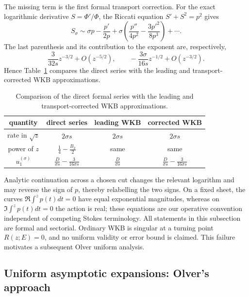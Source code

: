 \documentclass[11pt]{article}
\theoremstyle{remark}
\begin{document}
The missing term is the first formal transport correction.  For the exact
logarithmic derivative \(S=\Phi'/\Phi\), the Riccati equation
\(S'+S^2=p^2\) gives
\begin{equation}
 S_\sigma\sim \sigma p-\frac{p'}{2p}
 +\sigma\left(\frac{p''}{4p^2}-\frac{3p'^2}{8p^3}\right)+\cdots.
 \label{eq:lg-riccati-transport}
\end{equation}
The last parenthesis and its contribution to the exponent are, respectively,
\begin{equation}
 \frac{3}{32s}z^{-3/2}+O(z^{-5/2}),
 \qquad -\frac{3\sigma}{16s}z^{-1/2}+O(z^{-3/2}).
\end{equation}
Hence
Table~\ref{tab:wkb-transport-comparison} compares the direct series with the
leading and transport-corrected WKB approximations.
\begin{table}[htbp]
\centering
\caption{Comparison of the direct formal series with the leading and
transport-corrected WKB approximations.}
\label{tab:wkb-transport-comparison}
\begin{tabular}{c|c|c|c}
 quantity & direct series & leading WKB & corrected WKB\\ \hline
 rate in \(\sqrt z\) & \(2\sigma s\) & \(2\sigma s\) & \(2\sigma s\)\\
 power of \(z\) & \(\frac14-\frac{B_2}{2}\) & same & same\\
 \(u_1^{(\sigma)}\) & \(\frac{D}{\sigma s}-\frac{3}{16\sigma s}\)
 & \(\frac{D}{\sigma s}\)
 & \(\frac{D}{\sigma s}-\frac{3}{16\sigma s}\)
\end{tabular}
\end{table}

Analytic continuation across a chosen cut changes the relevant logarithm and
may reverse the sign of \(p\), thereby relabelling the two signs.  On a fixed
sheet, the curves \(\Re\int^z p(t)dt=0\) have equal exponential magnitudes,
whereas on \(\Im\int^z p(t)dt=0\) the action is real; these equations are our
operative convention independent of competing Stokes terminology.  All
statements in this subsection are formal and sectorial.  Ordinary WKB is
singular at a turning point \(R(z;E)=0\), and no uniform validity or error
bound is claimed.  This failure motivates a subsequent Olver uniform
analysis.

\subsection{Uniform asymptotic expansions: Olver's approach}
\label{subsec:olver-uniform}
\end{document}
